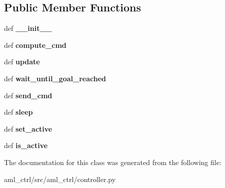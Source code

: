 \subsection*{Public Member Functions}
\begin{DoxyCompactItemize}
\item 
\hypertarget{classaml__ctrl_1_1controller_1_1_controller_ac1a1888ac43afe5d53e3120d3370db9e}{def {\bfseries \-\_\-\-\_\-init\-\_\-\-\_\-}}\label{classaml__ctrl_1_1controller_1_1_controller_ac1a1888ac43afe5d53e3120d3370db9e}

\item 
\hypertarget{classaml__ctrl_1_1controller_1_1_controller_aace14d69a66dfa391a7d1c8d137b4fe2}{def {\bfseries compute\-\_\-cmd}}\label{classaml__ctrl_1_1controller_1_1_controller_aace14d69a66dfa391a7d1c8d137b4fe2}

\item 
\hypertarget{classaml__ctrl_1_1controller_1_1_controller_ad6f4761cc5211316e70a424472748a2a}{def {\bfseries update}}\label{classaml__ctrl_1_1controller_1_1_controller_ad6f4761cc5211316e70a424472748a2a}

\item 
\hypertarget{classaml__ctrl_1_1controller_1_1_controller_a06f4b5748924ca72a3a6f349370122cd}{def {\bfseries wait\-\_\-until\-\_\-goal\-\_\-reached}}\label{classaml__ctrl_1_1controller_1_1_controller_a06f4b5748924ca72a3a6f349370122cd}

\item 
\hypertarget{classaml__ctrl_1_1controller_1_1_controller_a341e4994f8a876aef85601d622afc968}{def {\bfseries send\-\_\-cmd}}\label{classaml__ctrl_1_1controller_1_1_controller_a341e4994f8a876aef85601d622afc968}

\item 
\hypertarget{classaml__ctrl_1_1controller_1_1_controller_a4047e0ef3a57caf51b599f6d0dc78fe1}{def {\bfseries sleep}}\label{classaml__ctrl_1_1controller_1_1_controller_a4047e0ef3a57caf51b599f6d0dc78fe1}

\item 
\hypertarget{classaml__ctrl_1_1controller_1_1_controller_ab3cf24f3dae223949e893bc61595c89e}{def {\bfseries set\-\_\-active}}\label{classaml__ctrl_1_1controller_1_1_controller_ab3cf24f3dae223949e893bc61595c89e}

\item 
\hypertarget{classaml__ctrl_1_1controller_1_1_controller_a1952a0675d40dee30d917b3f00fe555f}{def {\bfseries is\-\_\-active}}\label{classaml__ctrl_1_1controller_1_1_controller_a1952a0675d40dee30d917b3f00fe555f}

\end{DoxyCompactItemize}


The documentation for this class was generated from the following file\-:\begin{DoxyCompactItemize}
\item 
aml\-\_\-ctrl/src/aml\-\_\-ctrl/controller.\-py\end{DoxyCompactItemize}
